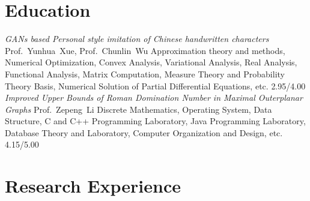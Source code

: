 \documentclass[11pt,a4paper, final]{moderncv}
\newcommand{\spacesubsection}{\vspace{0.2cm}}
\begin{document}
\section{\textbf{Education}}
	{\emph{GANs based Personal style imitation of Chinese handwritten characters}}
	{Prof.~Yunhua~Xue, Prof.~Chunlin~Wu}
	{Approximation theory and methods, Numerical Optimization, Convex Analysis, Variational Analysis, Real Analysis, Functional Analysis, 
	Matrix Computation, Measure Theory and Probability Theory Basis, Numerical Solution of Partial Differential Equations, etc.}
	{2.95/4.00}
	{\emph{Improved Upper Bounds of Roman Domination Number in Maximal Outerplanar Graphs}}
	{Prof.~Zepeng~Li}
	{Discrete Mathematics, Operating System, Data Structure, C and C++ Programming Laboratory, 
	Java Programming Laboratory, Database Theory and Laboratory, Computer Organization and Design, etc.}
	{4.15/5.00}
\section{\textbf{Research Experience}}
\end{document}
